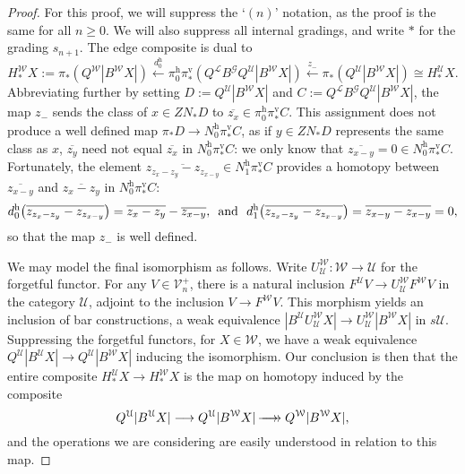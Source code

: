 \documentclass[11pt]{amsart} \renewcommand{\baselinestretch}{1.2}
\theoremstyle{plain}
\numberwithin{equation}{section} %
\theoremstyle{plain}
\numberwithin{equation}{chapter} %
\newcommand{\DASH}{\mathrm{-}}
\renewcommand{\to}{\longrightarrow}
\newcommand{\from}{\longleftarrow}
\newcommand{\scrG}{\mathscr{G}}
\newcommand{\calU}{\mathcal{U}}
\newcommand{\calL}{\mathcal{L}}
\newcommand{\calV}{\mathcal{V}}
\newcommand{\calw}{\mathcal{W}}
\newcommand{\vect}[2]{\calV^{#1}_{#2}}
\newcommand{\BSW}{{\scrG}}
\newcommand{\epi}{{\,\makebox[0cm][l]{\ensuremath\to}\to{}}}
\newcommand{\uver}{^\mathrm{v}}
\newcommand{\uhor}{^\mathrm{h}}
\begin{document}
\begin{Comp funct sseqs}
\begin{proof}For this proof, we will suppress the `$(n)$' notation, as the proof is the same for all $n\geq0$. We will also suppress all internal gradings, and write $*$ for the grading $s_{n+1}$. The edge composite is dual to
\[H_*^{\calw}X:=\pi_*(Q^{\calw}|B^{\calw}X|)\overset{d\uhor_0}{\from}\pi\uhor_0\pi\uver_*(Q^{\calL}B^{\BSW} Q^{\calU}|B^{\calw}X|)\overset{z_{\DASH}}{\from}\pi_*(Q^{\calU}|B^{\calw}X|)\cong H_*^{\calU}X.\]
Abbreviating further by setting $D:=Q^{\calU}|B^{\calw}X|$ and $C:=Q^{\calL}B^{\BSW} Q^{\calU}|B^{\calw}X|$, the map $z_{\DASH}$ sends the class of $x\in ZN_*D$ to $\overline{z_x}\in \pi\uhor_0\pi\uver_*C$. This assignment does not produce a well defined map $\pi_*D\to N\uhor_0\pi\uver_*C$, as if $y\in ZN_* D$ represents the same class as $x$, $\overline{z_y}$ need not equal $\overline{z_x}$ in $N\uhor_0\pi\uver_*C$: we only know that $\overline{z_{x-y}}=0\in N\uhor_0\pi\uver_*C$.
Fortunately, the element $\overline{z_{z_{x}-z_{y}}-z_{z_{x-y}}}\in N\uhor_1\pi\uver_*C$ provides a homotopy between $\overline{z_{x-y}}$ and $\overline{z_{x}-z_{y}}$ in $N\uhor_0\pi\uver_*C$:
%
\[d\uhor_0\!\left(\overline{z_{z_{x}-z_{y}}-z_{z_{x-y}}}\right)=\overline{z_x-z_y}-\overline{z_{x-y}}\textup{, \  and \ }d\uhor_1\!\left(\overline{z_{z_{x}-z_{y}}-z_{z_{x-y}}}\right)=\overline{z_{{x}-{y}}-z_{{x}-{y}}}=0,\]
so that the map $z_\DASH$ is well defined.

We may model the final isomorphism as follows. Write $U^{\calw}_{\calU}:\calw\to\calU$ for the forgetful functor. For any $V\in\vect{+}{n}$, there is a natural inclusion $F^{\calU}V\to U^{\calw}_{\calU} F^{\calw}V$ in the category  $\calU$, adjoint to the inclusion $V\to F^{\calw}V$. This morphism yields an inclusion of bar constructions, a weak equivalence $|B^{\calU}U^{\calw}_{\calU}X|\to U^{\calw}_{\calU}|B^{\calw}X|$ in $s\calU$. Suppressing the forgetful functors, for $X\in\calw$, we have a weak equivalence $Q^{\calU}|B^{\calU}X|\to Q^{\calU}|B^{\calw}X|$ inducing the isomorphism. Our conclusion is then that the entire composite $H_*^{\calU}X\to H_*^{\calw}X$ is the map on homotopy induced by the composite 
\[Q^{\calU}|B^{\calU}X|\to Q^{\calU}|B^{\calw}X| \epi Q^{\calw}|B^{\calw}X|,\]
and the operations we are considering are easily understood in relation to this map.
\end{proof}


\end{Comp funct sseqs}
\end{document}
